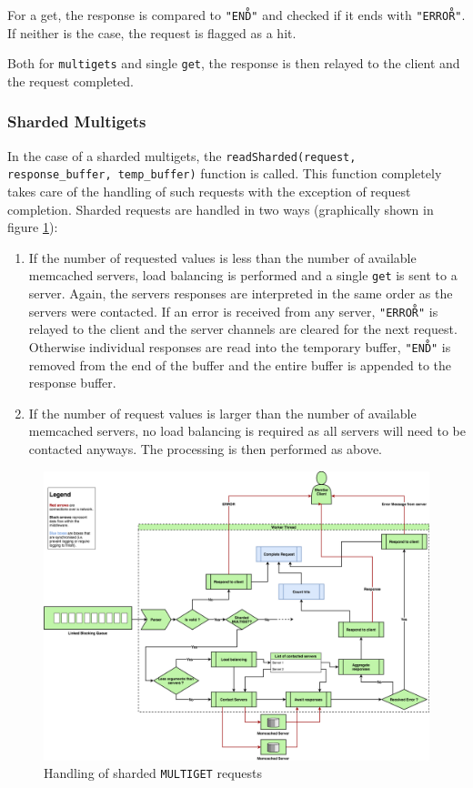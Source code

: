 \documentclass[11pt,a4paper]{article}
\begin{document}
For a get, the response is compared to \texttt{"END\r\n"} and checked if it ends with \texttt{"ERROR\r\n"}. If neither is the case, the request is flagged as a hit.

Both for \texttt{multigets} and single \texttt{get}, the response is then relayed to the client and the request completed.


\subsubsection{Sharded Multigets}
In the case of a sharded multigets, the \texttt{readSharded(request, response_buffer, temp_buffer)} function is called. This function completely takes care of the handling of such requests with the exception of request completion. Sharded requests are handled in two ways (graphically shown in figure \ref{png::multigets_handling}):
\begin{enumerate}
    \item If the number of requested values is less than the number of available memcached servers, load balancing is performed and a single \texttt{get} is sent to a server. Again, the servers responses are interpreted in the same order as the servers were contacted. If an error is received from any server, \texttt{"ERROR\r\n"} is relayed to the client and the server channels are cleared for the next request. Otherwise individual responses are read into the temporary buffer, \texttt{"END\r\n"} is removed from the end of the buffer and the entire buffer is appended to the response buffer.
    \item If the number of request values is larger than the number of available memcached servers, no load balancing is required as all servers will need to be contacted anyways. The processing is then performed as above.
\end{enumerate}
\begin{figure}[h]
    \centering
    \includegraphics[width=\textwidth]{processing/graphics/multigets_handling.png}
    \caption{Handling of sharded \texttt{MULTIGET} requests}
    \label{png::multigets_handling}
\end{figure}
\end{document}
